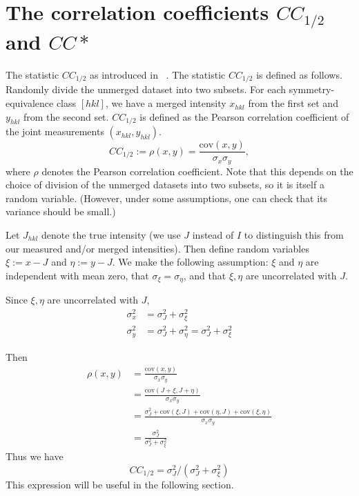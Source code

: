 \documentclass{report}
\newcommand{\CChalf}{CC_{1/2}}
\newcommand{\CCstar}{CC\ast}
\newcommand{\cov}{\mathrm{cov}}
\begin{document}
\section{The correlation coefficients $\CChalf$ and $\CCstar$}
The statistic $\CChalf$ as introduced in ~\cite{karplus-diederichs-2012}.
The statistic $\CChalf$ is defined as follows. Randomly divide the unmerged dataset into two subsets. For each symmetry-equivalence class $[hkl]$,
we have a merged intensity $x_{hkl}$ from the first set and $y_{hkl}$ from the second set. $\CChalf$ is defined as the Pearson correlation coefficient
of the joint measurements $(x_{hkl}, y_{hkl})$.
\begin{equation}
  \CChalf := \rho(x, y) = \frac{\cov(x, y)}{\sigma_x \sigma_y},
\end{equation}
where $\rho$ denotes the Pearson correlation coefficient. Note that this depends on the choice of division of the unmerged datasets into two subsets,
so it is itself a random variable. (However, under some assumptions, one can check that its variance should be small.)

Let $J_{hkl}$ denote the true intensity (we use $J$ instead of $I$ to distinguish this from our measured and/or merged intensities).
Then define random variables $\xi := x - J$ and $\eta := y - J$. We make the following assumption: $\xi$ and $\eta$ are independent
with mean zero, that $\sigma_\xi = \sigma_\eta$, and that $\xi,\eta$ are uncorrelated with $J$.

Since $\xi,\eta$ are uncorrelated with $J$,
\begin{align*}
  \sigma^2_x &= \sigma^2_J + \sigma^2_\xi \\
  \sigma^2_y &= \sigma^2_J + \sigma^2_\eta = \sigma^2_J + \sigma^2_\xi
\end{align*}

Then
\begin{align*}
  \rho(x,y)
  &= \frac{\cov(x, y)}{\sigma_x \sigma_y} \\
  &= \frac{\cov(J + \xi, J + \eta)}{\sigma_x \sigma_y} \\
  &= \frac{\sigma^2_J + \cov(\xi, J) + \cov(\eta, J) + \cov(\xi, \eta)}{\sigma_x \sigma_y} \\
  &= \frac{\sigma^2_J}{\sigma^2_J + \sigma^2_\xi} 
\end{align*}
Thus we have
\begin{equation}
  \label{cc-half-simplified}
  \CChalf = \sigma^2_J / \left(\sigma^2_J + \sigma^2_\xi \right)
\end{equation}
This expression will be useful in the following section.
\end{document}
